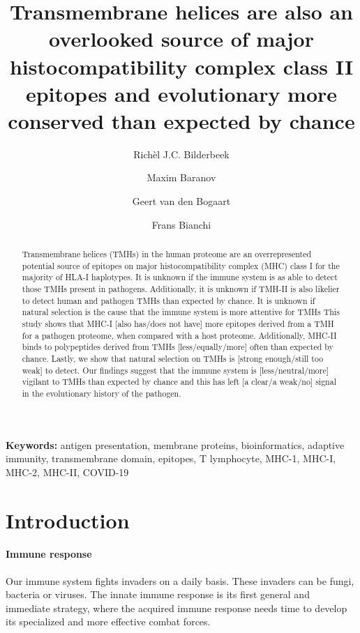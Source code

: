 \documentclass{article}
\title{
  Transmembrane helices are also 
  an overlooked source of major histocompatibility complex class II epitopes
  and evolutionary more conserved than expected by chance
}
\author[1]{Richèl J.C. Bilderbeek}
\author[1]{Maxim Baranov}
\author[1]{Geert van den Bogaart}
\author[1]{Frans Bianchi}
\affil[1]{GBB, University of 
Groningen, Groningen, The Netherlands}
\begin{document}
\maketitle

\begin{abstract}

Transmembrane helices (TMHs) in the human proteome
are an overrepresented potential source of epitopes on major 
histocompatibility complex (MHC) class I for the majority of HLA-I haplotypes. 
It is unknown if the immune system is as able to detect those 
TMHs present in pathogens.
Additionally, it is unknown if TMH-II is also likelier to detect
human and pathogen TMHs than expected by chance.
It is unknown if natural selection is the cause that 
the immune system is more attentive for TMHs
This study shows that MHC-I [also has/does not have] more
epitopes derived from a TMH for a pathogen proteome, when compared with
a host proteome.
Additionally, MHC-II binds to polypeptides derived from TMHs 
[less/equally/more] often than expected by chance.
Lastly, we show that natural selection on TMHs is [strong enough/still too weak]
to detect.
Our findings suggest that the immune system is [less/neutral/more]
vigilant to TMHs than expected by chance and this has 
left [a clear/a weak/no]
signal in the evolutionary history of the pathogen.

\end{abstract}

{\bf Keywords:} antigen presentation, membrane proteins, bioinformatics, 
adaptive immunity, transmembrane domain, epitopes, T lymphocyte, 
MHC-1, MHC-I, MHC-2, MHC-II, COVID-19

\section{Introduction}

\paragraph{Immune response}

Our immune system fights invaders on a daily basis.
These invaders can be fungi, bacteria or viruses.
The innate immune response is its first general 
and immediate strategy, where the acquired immune response
needs time to develop its specialized and more effective
combat forces.
\end{document}
